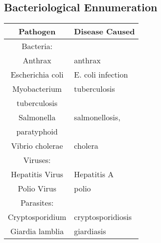 \subsection{Bacteriological Ennumeration}

\begin{tabular}{|c||l|}
\hline
\multicolumn{1}{|c|}{Pathogen} & \multicolumn{1}{c|}{Disease Caused} \\
\hline
Bacteria: &  \\
\hline\hline
Anthrax & anthrax \\
\hline\hline
Escherichia coli & E. coli infection \\
\hline\hline
Myobacterium & tuberculosis \\
tuberculosis &  \\
\hline\hline
Salmonella & salmonellosis, \\
paratyphoid &  \\
\hline\hline
Vibrio cholerae & cholera \\
\hline\hline
Viruses: &  \\
\hline\hline
Hepatitis Virus & Hepatitis A \\
\hline\hline
Polio Virus & polio \\
\hline\hline
Parasites: &  \\
\hline\hline
Cryptosporidium & cryptosporidiosis \\
\hline\hline
Giardia lamblia & giardiasis \\
\hline\hline
\end{tabular}

